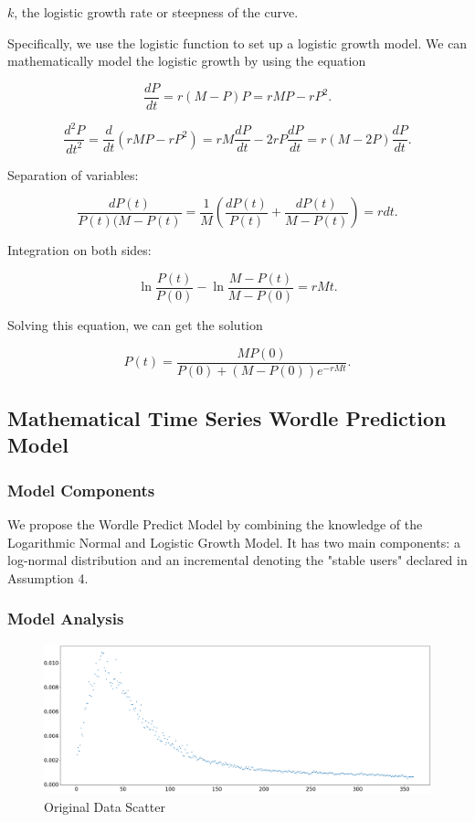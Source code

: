 \documentclass[12pt]{article}
\begin{document}
$k$, the logistic growth rate or steepness of the curve.

\vspace{0.3cm}
\noindent
Specifically, we use the logistic function to set up a logistic growth model. We can mathematically model the logistic growth by using the equation

$$
\frac{dP}{dt}=r(M-P)P=rMP-rP^2 \text{.}
$$

$$
\frac{d^2P}{dt^2}=\frac{d}{dt}(rMP-rP^2)=rM\frac{dP}{dt}-2rP\frac{dP}{dt}=r(M-2P)\frac{dP}{dt} \text{.}
$$

\vspace{0.3cm}
\noindent
Separation of variables:

$$
\frac{dP(t)}{P(t)(M-P(t)}=\frac{1}{M}\left(\frac{dP(t)}{P(t)}+\frac{dP(t)}{M-P(t)}\right)=rdt \text{.}
$$

\vspace{0.3cm}
\noindent
Integration on both sides:

$$
\ln\frac{P(t)}{P(0)}-\ln\frac{M-P(t)}{M-P(0)}=rMt \text{.}
$$

\vspace{0.3cm}
\noindent
Solving this equation, we can get the solution

$$
P(t)=\frac{MP(0)}{P(0)+(M-P(0))e^{-rMt}} \text{.}
$$

\subsection{Mathematical Time Series Wordle Prediction Model}

\subsubsection{Model Components}

We propose the Wordle Predict Model by combining the knowledge of the Logarithmic Normal and Logistic Growth Model. It has two main components: a log-normal distribution and an incremental denoting the "stable users" declared in Assumption 4. 

\subsubsection{Model Analysis}

\begin{figure}[h]
    \centering
    \includegraphics[width=15.5cm]{figures/scatter.png}
    \caption{Original Data Scatter}
    \label{scatter}
\end{figure}
\end{document}

